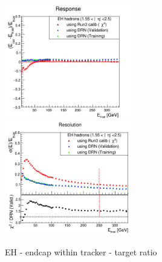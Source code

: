 \begin{figure}                                                                                                                                                                   
\includegraphics[width=0.495\textwidth]{./plots_pdf/HCAL_plots/Trained_target_ratioflip_0_500_10/pdf/EH_ec_in/EC_within_tracker_corrEtaEndcapEcalHcal.png}
\includegraphics[width=0.495\textwidth]{./plots_pdf/HCAL_plots/Trained_target_ratioflip_0_500_10/pdf/EH_ec_in/EC_within_tracker_corrEtaEndcapEcalHcal_reso.png}
\caption{EH - endcap within tracker - target ratio}
\end{figure}


